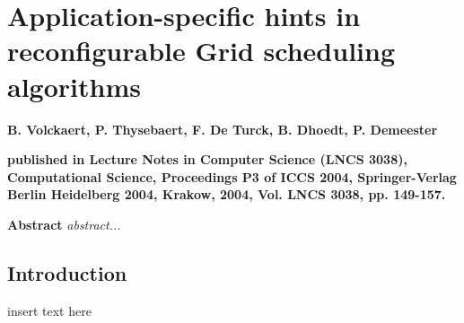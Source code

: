 
\graphicspath{{chapt_dutch/}{intro/}{chapt2/}{chapt3/}{chapt4/}{chapt5/}}

\renewcommand\evenpagerightmark{{\scshape\small Appendix B}}
\renewcommand\oddpageleftmark{{\scshape\small Application-specific hints in reconfigurable Grid scheduling algorithms}}

\renewcommand{\bibname}{References}

\hyphenation{}

\chapter[Application-specific hints in reconfigurable Grid scheduling algorithms]%
{Application-specific hints in reconfigurable Grid scheduling algorithms}
\label{app2}

\par{\large{\textbf{B. Volckaert, P. Thysebaert, F. De Turck, B. Dhoedt, P. Demeester}}}
\vspace{0.2in}
\par{\noindent\textbf{published in Lecture Notes in Computer Science (LNCS 3038), Computational Science, Proceedings P3 of ICCS 2004, Springer-Verlag Berlin Heidelberg 2004, Krakow, 2004, Vol. LNCS 3038, pp. 149-157.}}
\vspace{0.1in}

\par{\bf{Abstract}}
\emph{
abstract...
}


\section{Introduction}
insert text here




\clearpage{\pagestyle{empty}\cleardoublepage}